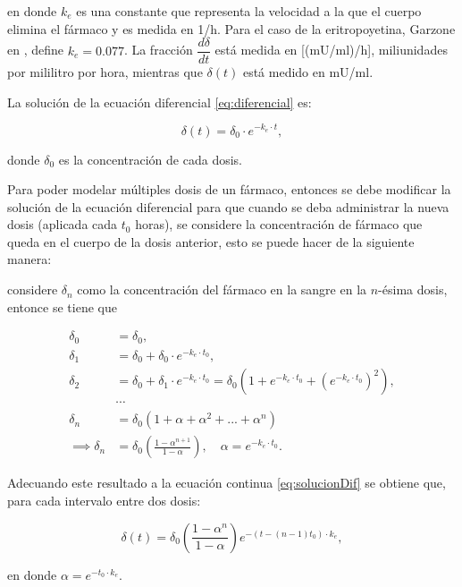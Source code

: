 en donde $k_e$ es una constante que representa la velocidad a la que el cuerpo elimina el fármaco y es medida en 1/h. Para el caso de la eritropoyetina, Garzone en \cite{GARZONE2012547}, define $k_e=0.077$. La fracción $\dfrac{d\delta}{dt}$ está medida en [(mU/ml)/h], miliunidades por mililitro por hora, mientras que $\delta(t)$ está medido en mU/ml.

La solución de la ecuación diferencial \ref{eq:diferencial} es:

\begin{equation}\label{eq:solucionDif}
    \delta(t)=\delta_0\cdot e^{-k_e\cdot t},
\end{equation}

donde $\delta_0$ es la concentración de cada dosis.

Para poder modelar múltiples dosis de un fármaco, entonces se debe modificar la solución de la ecuación diferencial para que cuando se deba administrar la nueva dosis (aplicada cada $t_0$ horas), se considere la concentración de fármaco que queda en el cuerpo de la dosis anterior, esto se puede hacer de la siguiente manera:

considere $\delta_n$ como la concentración del fármaco en la sangre en la $n$-ésima dosis, entonce se tiene que 

\begin{align*}
    \delta_0 &= \delta_0,\\
    \delta_1 &= \delta_0 + \delta_0\cdot e^{-k_e\cdot t_0}, \\
    \delta_2 &= \delta_0 + \delta_1\cdot e^{-k_e\cdot t_0}= \delta_0\left(1+e^{-k_e\cdot t_0}+\left(e^{-k_e\cdot t_0}\right)^2\right), \\
    &\cdots \\
    \delta_n &= \delta_0(1+\alpha+\alpha^2+...+\alpha^{n}) \\
    \implies \delta_n &= \delta_0\left(\frac{1-\alpha^{n+1}}{1-\alpha}\right),\quad \alpha=e^{-k_e\cdot t_0}.
\end{align*}

Adecuando este resultado a la ecuación continua \ref{eq:solucionDif} se obtiene que, para cada intervalo entre dos dosis:

\begin{equation*}
    \delta(t) = \delta_{0} \left(\dfrac{1-\alpha^{n}}{1 - \alpha}\right) e^{-(t- (n-1) t_{0})\cdot k_e},
\end{equation*}  

en donde $\alpha = e^{-t_0\cdot k_e}$.

